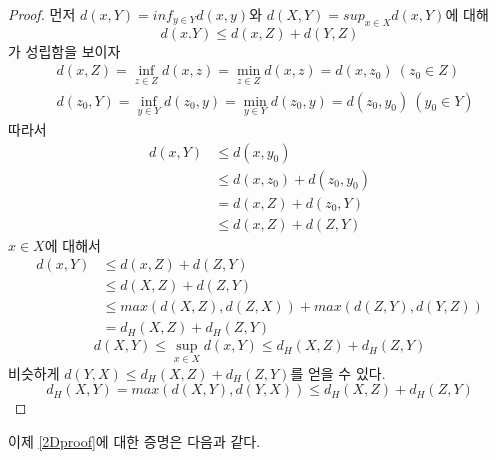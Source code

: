\documentclass{gshs_thesis}
\theoremstyle{theorem}
\theoremstyle{lemma}
\theoremstyle{definition}
\begin{document}
\begin{proof}
	먼저 $d(x,Y)=inf_{y\in{Y}}d(x,y)$와 $d(X,Y)=sup_{x\in{X}}d(x,Y)$에 대해
	\begin{equation}
		d(x.Y)\leq{d(x,Z)+d(Y,Z)}
	\end{equation}
    가 성립함을 보이자
    \begin{equation}
    	\begin{split}
    		&d(x,Z)=\inf_{z\in{Z}}d(x,z)=\min_{z\in{Z}}d(x,z)=d(x,z_{0}) \ (z_{0}\in{Z})  \\
    		&d(z_{0},Y)=\inf_{y\in{Y}}d(z_{0},y)=\min_{y\in{Y}}d(z_{0},y)=d(z_{0},y_{0}) \ (y_{0}\in{Y})
    	\end{split}
    \end{equation}
따라서
    \begin{equation}
	    \begin{split}
		   d(x,Y)&\leq{d(x,y_{0})}  \\
		   &\leq{d(x,z_{0})+d(z_{0},y_{0})}  \\
		   &=d(x,Z)+d(z_{0},Y)  \\
		   &\leq{d(x,Z)+d(Z,Y)}
     	\end{split}
    \end{equation}
$x\in{X}$에 대해서 
   \begin{equation}
     	\begin{split}
		d(x,Y)&\leq{d(x,Z)+d(Z,Y)}  \\
		&\leq{d(X,Z)+d(Z,Y)}  \\
		&\leq{max(d(X,Z),d(Z,X))+max(d(Z,Y),d(Y,Z))}  \\
		&=d_{H}(X,Z)+d_{H}(Z,Y)
     	\end{split}
   \end{equation}
   \begin{equation}
   	d(X,Y)\leq{\sup_{x\in{X}}d(x,Y)}\leq{d_{H}(X,Z)+d_{H}(Z,Y)}
   \end{equation}
비슷하게 $d(Y,X)\leq{d_{H}(X,Z)+d_{H}(Z,Y)}$를 얻을 수 있다.
   \begin{equation}
   	d_{H}(X,Y)=max(d(X,Y),d(Y,X))\leq{d_{H}(X,Z)+d_{H}(Z,Y)}
   \end{equation}
\end{proof}
이제 \cref{2Dproof}에 대한 증명은 다음과 같다.
\end{document}
